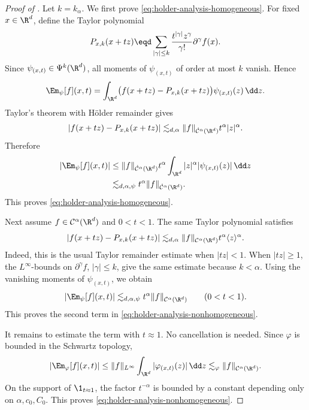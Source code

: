 \begin{proof}[Proof of ]
  Let \(k = k_{\alpha}\). We first prove
  \eqref{eq:holder-analysis-homogeneous}. For fixed \(x \in \R^d\), define
  the Taylor polynomial
  \[
    P_{x, k}(x + tz)
    \eqd
    \sum_{|\gamma| \le k}
    \frac{t^{|\gamma|} z^{\gamma}}{\gamma!}
    \partial^{\gamma} f(x).
  \]
  Since \(\psi_{(x, t)} \in \Psi^k(\R^d)\), all moments of
  \(\psi_{(x, t)}\) of order at most \(k\) vanish. Hence
  \[
    \Em_{\psi}[f](x, t)
    =
    \int_{\R^d}
    \bigl(f(x + tz) - P_{x, k}(x + tz)\bigr)
    \psi_{(x, t)}(z) \, \dd z.
  \]
  Taylor's theorem with H{\"o}lder remainder gives
  \[
    |f(x + tz) - P_{x, k}(x + tz)|
    \lesssim_{d, \alpha}
    \|f\|_{\dot{\mathcal{C}}^{\alpha}(\R^d)}
    t^{\alpha}|z|^{\alpha}.
  \]
  Therefore
  \[
    |\Em_{\psi}[f](x, t)|
    \begin{aligned}[t]
    &\le
    \|f\|_{\dot{\mathcal{C}}^{\alpha}(\R^d)}
    t^{\alpha}
    \int_{\R^d} |z|^{\alpha} |\psi_{(x, t)}(z)| \, \dd z
    \\
    &\lesssim_{d, \alpha, \psi}
    t^{\alpha}
    \|f\|_{\dot{\mathcal{C}}^{\alpha}(\R^d)}.
    \end{aligned}
  \]
  This proves \eqref{eq:holder-analysis-homogeneous}.

  Next assume \(f \in \mathcal{C}^{\alpha}(\R^d)\) and \(0 < t < 1\). The
  same Taylor polynomial satisfies
  \[
    |f(x + tz) - P_{x, k}(x + tz)|
    \lesssim_{d, \alpha}
    \|f\|_{\mathcal{C}^{\alpha}(\R^d)}
    t^{\alpha} \langle z \rangle^{\alpha}.
  \]
  Indeed, this is the usual Taylor remainder estimate when \(|tz| < 1\). When
  \(|tz| \ge 1\), the \(L^{\infty}\)-bounds on
  \(\partial^{\gamma}f\), \(|\gamma| \le k\), give the same estimate because
  \(k < \alpha\). Using the vanishing moments of \(\psi_{(x, t)}\), we obtain
  \[
    |\Em_{\psi}[f](x, t)|
    \lesssim_{d, \alpha, \psi}
    t^{\alpha}
    \|f\|_{\mathcal{C}^{\alpha}(\R^d)}
    \qquad (0 < t < 1).
  \]
  This proves the second term in
  \eqref{eq:holder-analysis-nonhomogeneous}.

  It remains to estimate the term with \(t \approx 1\). No cancellation is
  needed. Since \(\varphi\) is bounded in the Schwartz topology,
  \[
    |\Em_{\varphi}[f](x, t)|
    \le
    \|f\|_{L^{\infty}}
    \int_{\R^d} |\varphi_{(x, t)}(z)| \, \dd z
    \lesssim_{\varphi}
    \|f\|_{\mathcal{C}^{\alpha}(\R^d)}.
  \]
  On the support of \(\1_{t \approx 1}\), the factor \(t^{-\alpha}\) is bounded
  by a constant depending only on \(\alpha, c_0, C_0\). This proves
  \eqref{eq:holder-analysis-nonhomogeneous}.
\end{proof}

